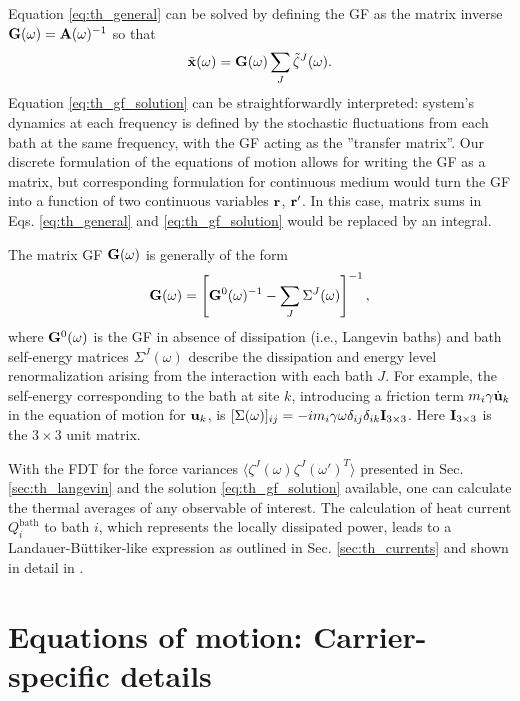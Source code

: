 Equation \eqref{eq:th_general} can be solved by defining the GF as the matrix inverse $\mathbf{G}(\omega)=\mathbf{A}(\omega)^{-1}$ so that  
\begin{equation}
 \tilde{\mathbf{x}}(\omega)  =  \mathbf{G}(\omega) \sum_J \tilde \zeta^J(\omega). \label{eq:th_gf_solution}
\end{equation}
Equation \eqref{eq:th_gf_solution} can be straightforwardly interpreted: system's dynamics at each frequency is defined by the stochastic fluctuations from each bath at the same frequency, with the GF acting as the ''transfer matrix''. Our discrete formulation of the equations of motion allows for writing the GF as a matrix, but corresponding formulation for continuous medium would turn the GF into a function of two continuous variables $\mathbf{r}$, $\mathbf{r}'$. In this case, matrix sums in Eqs. \eqref{eq:th_general} and \eqref{eq:th_gf_solution} would be replaced by an integral.

The matrix GF $\mathbf{G}(\omega)$ is generally of the form \cite{datta}
\begin{equation}
 \mathbf{G}(\omega) = \left[\mathbf{G}^0(\omega)^{-1} - \sum_J \Sigma^J(\omega) \right]^{-1},
\end{equation}
where $\mathbf{G}^0(\omega)$ is the GF in absence of dissipation (i.e., Langevin baths) and bath self-energy matrices $\Sigma^J(\omega)$ describe the dissipation and energy level renormalization arising from the interaction with each bath $J$. For example, the self-energy corresponding to the bath at site $k$, introducing a friction term $m_i\gamma \dot{\mathbf{u}}_k$ in the equation of motion for $\mathbf{u}_k$, is $[\Sigma(\omega)]_{ij}=-im_i\gamma \omega \delta_{ij} \delta_{ik}\mathbf{I}_{3 \times 3}$. Here $\mathbf{I}_{3 \times 3}$ is the $3\times3$ unit matrix. 

With the FDT for the force variances $\langle \zeta^J(\omega) \zeta^J(\omega')^T \rangle$ presented in Sec. \ref{sec:th_langevin} and the solution \eqref{eq:th_gf_solution} available, one can calculate the thermal averages of any observable of interest. The calculation of heat current $ Q_i^{\textrm{bath}}$ to bath $i$, which represents the locally dissipated power, leads to a Landauer-B\"uttiker-like expression \cite{landauer57,buttiker92} as outlined in Sec. \ref{sec:th_currents} and shown in detail in . 

\section{Equations of motion: Carrier-specific details}
\label{sec:th_eom2}

